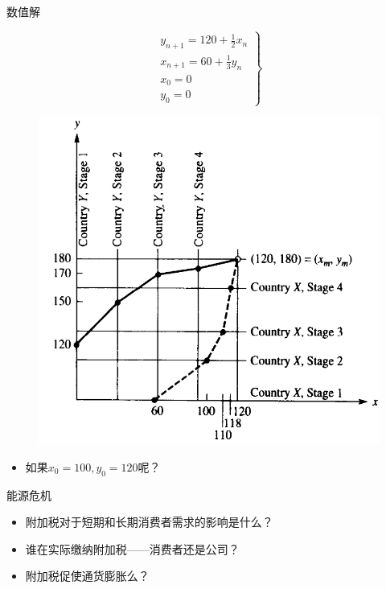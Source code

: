 \documentclass[UTF8]{ctexbeamer}
\begin{document}
\begin{frame}{数值解}
  \begin{figure}
    \begin{minipage}{.5\linewidth}
      \[
      \left.
        \begin{array}{l}
          y_{n+1}=120 + \frac{1}{2}x_n\\
          x_{n+1}=60 + \frac{1}{3}y_n\\
          x_0 = 0\\
          y_0 = 0
        \end{array}
      \right\}
      \]
    \end{minipage}%
    \begin{minipage}{.5\linewidth}
      \includegraphics[width=\textwidth]{arc.png}
    \end{minipage}
  \end{figure}

  \begin{itemize}
  \item 如果$x_0=100, y_0=120$呢？
  \end{itemize}

\end{frame}

\begin{frame}{能源危机}
  \begin{itemize}
  \item 附加税对于短期和长期消费者需求的影响是什么？
  \item 谁在实际缴纳附加税——消费者还是公司？
  \item 附加税促使通货膨胀么？
  \end{itemize}
\end{frame}
\end{document}
